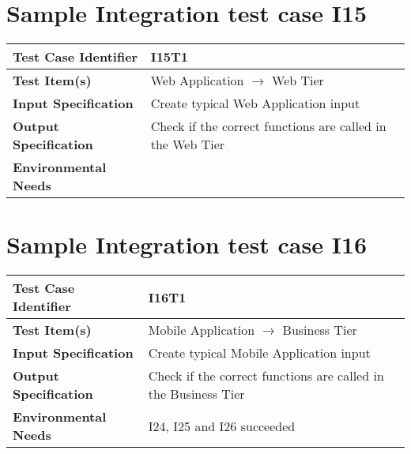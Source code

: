 \section{Sample Integration test case I15}\label{I15}
\begin{center}
	\vspace{0.6cm}
	\begin{tabular}{|l|l|}
		\hline
		\textbf{Test Case Identifier} & I15T1 \bigstrut \\\hline
		\textbf{Test Item(s)} & Web Application \ensuremath{\rightarrow} Web Tier \bigstrut \\\hline
		\textbf{Input Specification} & Create typical Web Application input \bigstrut \\\hline
		\textbf{Output Specification} & Check if the correct functions are called in the Web Tier \bigstrut \\\hline
		\textbf{Environmental Needs} & \bigstrut \\\hline
	\end{tabular}
\end{center}

\section{Sample Integration test case I16}\label{I16}
\begin{center}
	\vspace{0.6cm}
	\begin{tabular}{|l|l|}
		\hline
		\textbf{Test Case Identifier} & I16T1 \bigstrut \\\hline
		\textbf{Test Item(s)} & Mobile Application \ensuremath{\rightarrow} Business Tier \bigstrut \\\hline
		\textbf{Input Specification} & Create typical Mobile Application input \bigstrut \\\hline
		\textbf{Output Specification} & Check if the correct functions are called in the Business Tier \bigstrut \\\hline
		\textbf{Environmental Needs} & I24, I25 and I26 succeeded \bigstrut \\\hline
	\end{tabular}
\end{center}

